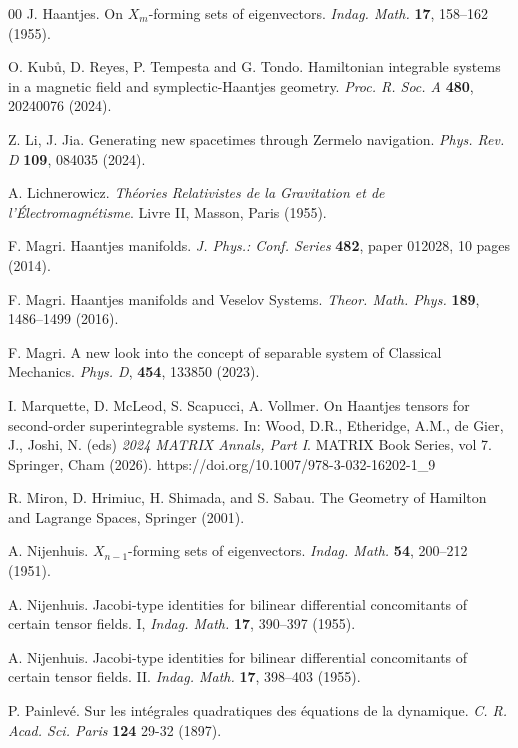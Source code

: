 \documentclass[10pt]{amsart}
\numberwithin{equation}{section}
\newcommand{\tbf}{\textbf}
\theoremstyle{definition}
\begin{document}
\begin{thebibliography}{00}
		 J. Haantjes. On $X_{m}$-forming sets of eigenvectors. \textit{Indag. Math.} \textbf{ 17}, 158--162 (1955).
		
 O. Kub{\r u}, D. Reyes, P. Tempesta and G. Tondo. Hamiltonian integrable systems in a magnetic field and symplectic-Haantjes geometry. \textit{Proc. R. Soc. A} \textbf{480}, 20240076 (2024).
		
		
		 Z. Li, J. Jia. Generating new spacetimes through Zermelo
		navigation. \textit{Phys. Rev. D} \textbf{109}, 084035 (2024).
		
		 A. Lichnerowicz. \textit{Th\'eories Relativistes de la Gravitation et de l'\'Electromagn\'etisme}. Livre II, Masson, Paris (1955).
		
		 F. Magri. Haantjes manifolds. \textit{J. Phys.: Conf. Series} \textbf{482}, paper 012028, 10 pages (2014).
		
		 F. Magri. Haantjes manifolds and Veselov Systems. \textit{Theor. Math. Phys.} \textbf{189}, 1486--1499 (2016).
		
		 F. Magri. A new look into the concept of separable system of Classical Mechanics. \textit{Phys. D}, \textbf{454}, 133850 (2023).
		
		 I. Marquette, D. McLeod, S. Scapucci, A. Vollmer. On Haantjes tensors for second-order superintegrable systems. In: Wood, D.R., Etheridge, A.M., de Gier, J., Joshi, N. (eds) \textit{2024 MATRIX Annals, Part I}. MATRIX Book Series, vol 7. Springer, Cham (2026). https://doi.org/10.1007/978-3-032-16202-1\_9
		
		 R. Miron, D. Hrimiuc, H. Shimada, and S. Sabau. The Geometry of Hamilton and Lagrange Spaces, Springer (2001).
		
		
 A. Nijenhuis. $X_{n-1}$-forming sets of eigenvectors. \textit{Indag. Math.} \textbf{54}, 200--212 (1951).
		
		 A. Nijenhuis. Jacobi-type identities for bilinear differential concomitants of certain tensor fields. I, \textit{Indag. Math.} \textbf{17}, 390--397 (1955).
		
		 A. Nijenhuis. Jacobi-type identities for bilinear differential concomitants of certain tensor fields. II. \textit{Indag. Math.} \textbf{17}, 398--403 (1955).
		
		
		 P. Painlev\'e. Sur les int\'egrales quadratiques des \'equations de la dynamique. \textit{C. R. Acad. Sci. Paris} \tbf{124} 29-32 (1897).
		

\end{thebibliography}
\end{document}
